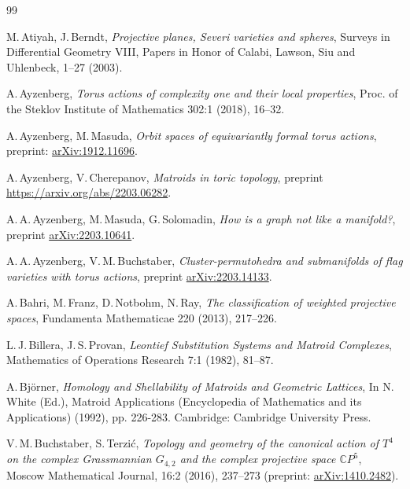 \documentclass[english,12pt,oneside]{amsproc}
\newcommand{\CP}{\mathbb{C}P}
\numberwithin{equation}{section}
\theoremstyle{plain}
\theoremstyle{definition}
\theoremstyle{remark}
\begin{document}
\begin{thebibliography}{99}

 M.\,Atiyah, J.\,Berndt, \textit{Projective planes, Severi varieties and spheres}, Surveys in Differential Geometry VIII, Papers in Honor of Calabi, Lawson, Siu and Uhlenbeck, 1--27 (2003).

 A.\,Ayzenberg, \textit{Torus actions of complexity one and their local properties}, Proc. of the Steklov Institute of Mathematics 302:1 (2018), 16--32.

 A.\,Ayzenberg, M.\,Masuda, \textit{Orbit spaces of equivariantly formal torus actions}, preprint: \href{https://arxiv.org/abs/1912.11696}{arXiv:1912.11696}.

 A.\,Ayzenberg, V.\,Cherepanov, \textit{Matroids in toric topology}, preprint \href{https://arxiv.org/abs/2203.06282}{https://arxiv.org/abs/2203.06282}.

 A.\,A.\,Ayzenberg, M.\,Masuda, G.\,Solomadin, \textit{How is a graph not like a manifold?}, preprint \href{https://arxiv.org/abs/2203.10641}{arXiv:2203.10641}.

 A.\,A.\,Ayzenberg, V.\,M.\,Buchstaber, \textit{Cluster-permutohedra and submanifolds of flag varieties with torus actions}, preprint \href{https://arxiv.org/abs/2203.14133}{arXiv:2203.14133}.

 A.\,Bahri, M.\,Franz, D.\,Notbohm, N.\,Ray, \textit{The classification of weighted projective spaces}, Fundamenta Mathematicae 220 (2013), 217--226.

 L.\,J.\,Billera, J.\,S.\,Provan, \textit{Leontief Substitution Systems and Matroid Complexes}, Mathematics of Operations Research 7:1 (1982), 81--87.

 A.\,Bj\"{o}rner, \textit{Homology and Shellability of Matroids and Geometric Lattices}, In N. White (Ed.), Matroid Applications (Encyclopedia of Mathematics and its Applications) (1992), pp. 226-283. Cambridge: Cambridge University Press.



 V.\,M.\,Buchstaber, S.\,Terzi\'{c}, \textit{Topology and geometry of the canonical action of $T^4$ on the complex
Grassmannian $G_{4,2}$ and the complex projective space $\CP^5$}, Moscow Mathematical Journal, 16:2 (2016), 237--273 (preprint:
\href{https://arxiv.org/abs/1410.2482}{arXiv:1410.2482}).


\end{thebibliography}
\end{document}
